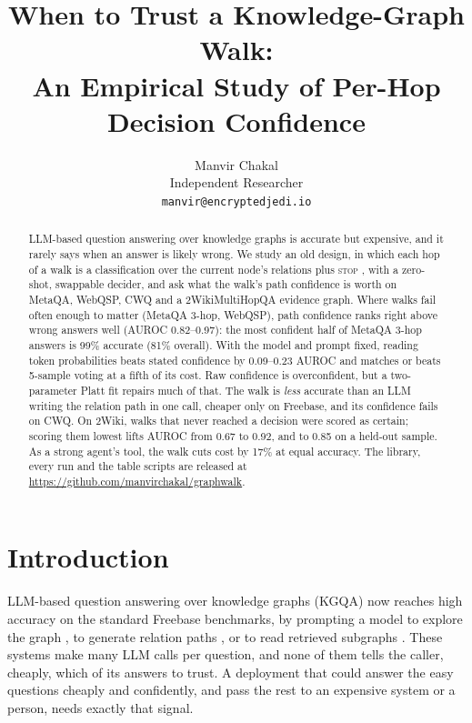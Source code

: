 \documentclass[11pt]{article}
\title{When to Trust a Knowledge-Graph Walk:\\
An Empirical Study of Per-Hop Decision Confidence}
\author{Manvir Chakal \\
  Independent Researcher \\
  \texttt{manvir@encryptedjedi.io}}
\newcommand{\stopop}{\textsc{stop}}
\begin{document}
\maketitle

\begin{abstract}
LLM-based question answering over knowledge graphs is accurate but expensive, and it
rarely says when an answer is likely wrong. We study an old design,
in which each hop of a walk is a classification over the current node's relations plus
\stopop{} \citep{zhang2022sr,das2018minerva}, with a zero-shot, swappable decider, and
ask what the walk's path confidence is worth on MetaQA, WebQSP, CWQ and a
2WikiMultiHopQA evidence graph. Where walks fail often enough to matter (MetaQA 3-hop,
WebQSP), path confidence ranks right above wrong answers well (AUROC 0.82--0.97): the
most confident half of MetaQA 3-hop answers is 99\% accurate (81\% overall).
With the model and prompt fixed, reading token probabilities beats stated confidence by
0.09--0.23 AUROC and matches or beats 5-sample voting at a fifth of its cost. Raw
confidence is overconfident, but a two-parameter Platt fit repairs much of that. The
walk is \emph{less} accurate than an LLM writing the relation path in one call, cheaper
only on Freebase, and its confidence fails on CWQ. On 2Wiki, walks that never reached a
decision were scored as certain; scoring them lowest lifts AUROC from 0.67 to 0.92, and
to 0.85 on a held-out sample. As a strong agent's tool, the walk cuts cost by 17\% at
equal accuracy. The library, every run and the table scripts are released at
\url{https://github.com/manvirchakal/graphwalk}.
\end{abstract}

\section{Introduction}

LLM-based question answering over knowledge graphs (KGQA) now reaches high accuracy on
the standard Freebase benchmarks, by prompting a model to explore the graph
\citep{sun2024tog,jiang2025kgagent}, to generate relation paths \citep{luo2024rog}, or
to read retrieved subgraphs \citep{mavromatis2024gnnrag}. These systems make many LLM
calls per question, and none of them tells the caller, cheaply, which of its answers to
trust. A deployment that could answer the easy questions cheaply and confidently, and
pass the rest to an expensive system or a person, needs exactly that signal.
\end{document}
